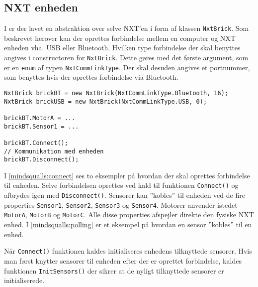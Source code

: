 \subsection{NXT enheden}
I \mindsqualls er der lavet en abstraktion over selve NXT'en i form af klassen \lstinline[style=csharp]!NxtBrick!.
Som beskrevet herover kan der oprettes forbindelse mellem en computer og NXT enheden vha. USB eller Bluetooth.
Hvilken type forbindelse der skal benyttes angives i constructoren for \lstinline[style=csharp]!NxtBrick!.
Dette gøres med det første argument, som er en \lstinline[style=csharp]!enum! af typen \lstinline[style=csharp]!NxtCommLinkType!.
Der skal desuden angives et portnummer, som benyttes hvis der oprettes forbindelse via Bluetooth.

\begin{lstlisting}[style=csharpsmall,caption={Forbindelse til NXT enheder},label=mindsqualls:connect]
NxtBrick brickBT = new NxtBrick(NxtCommLinkType.Bluetooth, 16);
NxtBrick brickUSB = new NxtBrick(NxtCommLinkType.USB, 0);

brickBT.MotorA = ...
brickBT.Sensor1 = ...

brickBT.Connect();
// Kommunikation med enheden
brickBT.Disconnect();
\end{lstlisting}

I \cref{mindsqualls:connect} ses to eksempler på hvordan der skal oprettes forbindelse til enheden.
Selve forbindelsen oprettes ved kald til funktionen \lstinline[style=csharp]!Connect()! og afbrydes igen med \lstinline[style=csharp]!Disconnect()!.
Sensorer kan ''kobles'' til enheden ved de fire properties \lstinline[style=csharp]!Sensor1!, \lstinline[style=csharp]!Sensor2!, \lstinline[style=csharp]!Sensor3! og \lstinline[style=csharp]!Sensor4!.
Motorer anvender istedet \lstinline[style=csharp]!MotorA!, \lstinline[style=csharp]!MotorB! og \lstinline[style=csharp]!MotorC!.
Alle disse properties afspejler direkte den fysiske NXT enhed.
I \cref{mindsqualls:polling} er et eksempel på hvordan en sensor ''kobles'' til en enhed.

Når \lstinline[style=csharp]!Connect()! funktionen kaldes initialiseres enhedens tilknyttede sensorer.
Hvis man først knytter sensorer til enheden efter der er oprettet forbindelse, kaldes funktionen \lstinline[style=csharp]!InitSensors()! der sikrer at de nyligt tilknyttede sensorer er initialiserede.

